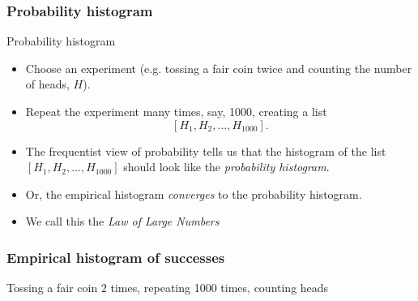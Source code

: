 \documentclass[handout]{beamer}
\begin{document}
   \begin{frame} \frametitle{Probability histogram}

   \begin{block}
     {Probability histogram}
     \begin{itemize}
     \item Choose an experiment (e.g. tossing a fair coin twice and
     counting the number of heads, $H$).
     \item Repeat the experiment many times, say, 1000, creating a list
     $$
     [H_1, H_2, \dots, H_{1000}].
     $$
     \item The frequentist view of probability tells us that
     the histogram of the list $[H_1, H_2, \dots, H_{1000}]$
     should look like the {\em probability histogram}.

     \item Or, the empirical histogram {\em converges} to the
     probability histogram.
     \item We call this the {\em Law of Large Numbers}
     \end{itemize}
   \end{block}
   \end{frame}



   \begin{frame}
   \frametitle{Empirical histogram of successes}
   \begin{center}
   \end{center}
   Tossing a fair coin 2 times, repeating 1000 times, counting heads
   \end{frame}

\end{document}
